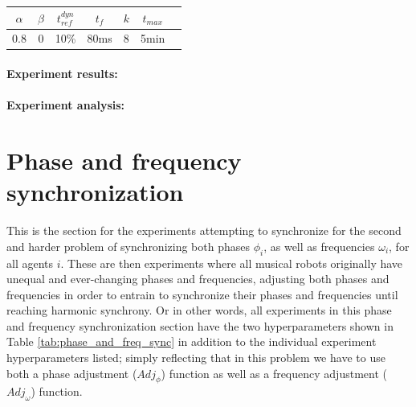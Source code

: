 			\begin{center}
			\begin{tabular}{ |c|c|c|c|c|c|c| } 
			\hline
			$\alpha$ & $\beta$ & $t_{ref}^{dyn}$ & $t_f$ & $k$ & $t_{max}$ \\
			\hline
			0.8 & 0 & 10\% & 80ms & 8 & 5min \\
			\hline
			\end{tabular}
			\label{tab:phase_sync_heterogenous_SA_scopes}
			\end{center}
	
	
			\paragraph{Experiment results:\nl}
			
			
			\paragraph{Experiment analysis:\nl}
	



\section{Phase and frequency synchronization}
\label{sec:phase_and_freq_sync_experiments}
This is the section for the experiments attempting to synchronize for the second and harder problem of synchronizing both phases $\phi_i$, as well as frequencies $\omega_i$, for all agents $i$. These are then experiments where all musical robots originally have unequal and ever-changing phases and frequencies, adjusting both phases and frequencies in order to entrain to synchronize their phases and frequencies until reaching harmonic synchrony. Or in other words, all experiments in this phase and frequency synchronization section have the two hyperparameters shown in Table \ref{tab:phase_and_freq_sync} in addition to the individual experiment hyperparameters listed; simply reflecting that in this problem we have to use both a phase adjustment ($Adj_{\phi}$) function as well as a frequency adjustment ($Adj_{\omega}$) function.

